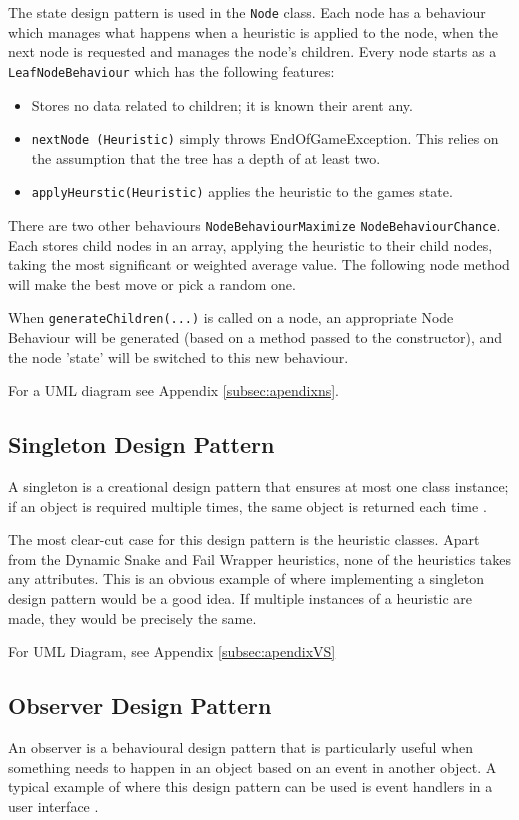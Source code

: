 \documentclass{article}
\begin{document}
The state design pattern is used in the \texttt{Node} class. Each node has a behaviour which manages what happens when a heuristic is applied to the node, when the next node is requested and manages the node's children. Every node starts as a \texttt{LeafNodeBehaviour} which has the following features:
\begin{itemize}
    \item Stores no data related to children; it is known their aren\textquotesingle t any.
    \item \texttt{nextNode (Heuristic)} simply throws EndOfGameException. This relies on the assumption that the tree has a depth of at least two.
    \item \texttt{applyHeurstic(Heuristic)} applies the heuristic to the games state.
\end{itemize}

There are two other behaviours \texttt{NodeBehaviourMaximize} \texttt{NodeBehaviourChance}. Each stores child nodes in an array, applying the heuristic to their child nodes, taking the most significant or weighted average value. The following node method will make the best move or pick a random one.

When \texttt{generateChildren(...)} is called on a node, an appropriate Node Behaviour will be generated (based on a method passed to the constructor), and the node 'state' will be switched to this new behaviour.

For a UML diagram see Appendix \ref{subsec:apendixns}.

\subsection{Singleton Design Pattern}
\label{subsec:singleton}
A singleton is a creational design pattern that ensures at most one class instance; if an object is required multiple times, the same object is returned each time \cite{CS2800_creational}.

The most clear-cut case for this design pattern is the heuristic classes. Apart from the Dynamic Snake and Fail Wrapper heuristics, none of the heuristics takes any attributes. This is an obvious example of where implementing a singleton design pattern would be a good idea. If multiple instances of a heuristic are made, they would be precisely the same.

For UML Diagram, see Appendix \ref{subsec:apendixVS}
\subsection{Observer Design Pattern}
\label{subsec:observer}
An observer is a behavioural design pattern that is particularly useful when something needs to happen in an object based on an event in another object.
A typical example of where this design pattern can be used is event handlers in a user interface \cite{CS2800_behavioural}.
\end{document}

